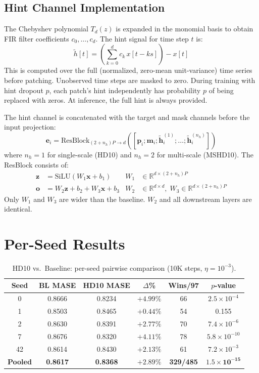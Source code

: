 \documentclass{article}
\begin{document}
\subsection{Hint Channel Implementation}

The Chebyshev polynomial $T_d(z)$ is expanded in the monomial basis to obtain FIR filter coefficients $c_0, \ldots, c_d$. The hint signal for time step $t$ is:
\[
\tilde{h}[t] = \left(\sum_{k=0}^{d} c_k \, x[t - ks]\right) - x[t]
\]
This is computed over the full (normalized, zero-mean unit-variance) time series before patching. Unobserved time steps are masked to zero. During training with hint dropout $p$, each patch's hint independently has probability $p$ of being replaced with zeros. At inference, the full hint is always provided.

The hint channel is concatenated with the target and mask channels before the input projection:
\[
\mathbf{e}_i = \text{ResBlock}_{(2+n_h)P \to d}([\mathbf{p}_i; \mathbf{m}_i; \tilde{\mathbf{h}}^{(1)}_i; \ldots; \tilde{\mathbf{h}}^{(n_h)}_i])
\]
where $n_h = 1$ for single-scale (HD10) and $n_h = 2$ for multi-scale (MSHD10). The ResBlock consists of:
\begin{align}
\mathbf{z} &= \text{SiLU}(W_1 \mathbf{x} + b_1) & W_1 &\in \mathbb{R}^{d \times (2+n_h)P} \\
\mathbf{o} &= W_2 \mathbf{z} + b_2 + W_3 \mathbf{x} + b_3 & W_2 &\in \mathbb{R}^{d \times d}, \; W_3 \in \mathbb{R}^{d \times (2+n_h)P}
\end{align}
Only $W_1$ and $W_3$ are wider than the baseline. $W_2$ and all downstream layers are identical.

\section{Per-Seed Results}
\label{app:seeds}

\begin{table}[h]
\centering
\caption{HD10 vs.\ Baseline: per-seed pairwise comparison (10K steps, $\eta = 10^{-3}$).}
\small
\begin{tabular}{cccccc}
\toprule
\textbf{Seed} & \textbf{BL MASE} & \textbf{HD10 MASE} & \textbf{$\Delta$\%} & \textbf{Wins/97} & \textbf{$p$-value} \\
\midrule
0 & 0.8666 & 0.8234 & $+4.99\%$ & 66 & $2.5 \times 10^{-4}$ \\
1 & 0.8503 & 0.8465 & $+0.44\%$ & 54 & 0.155 \\
2 & 0.8630 & 0.8391 & $+2.77\%$ & 70 & $7.4 \times 10^{-6}$ \\
7 & 0.8676 & 0.8320 & $+4.11\%$ & 78 & $5.8 \times 10^{-10}$ \\
42 & 0.8614 & 0.8430 & $+2.13\%$ & 61 & $7.2 \times 10^{-3}$ \\
\midrule
\textbf{Pooled} & \textbf{0.8617} & \textbf{0.8368} & \textbf{$+2.89\%$} & \textbf{329/485} & $\mathbf{1.5 \times 10^{-15}}$ \\
\bottomrule
\end{tabular}
\end{table}
\end{document}
